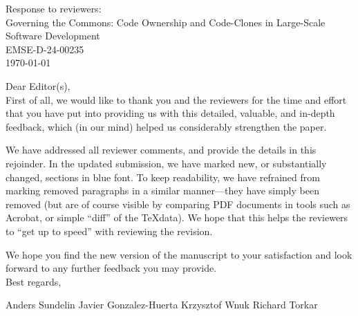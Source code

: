 \documentclass[a4paper,11pt, parskip=half]{scrartcl}
\newcommand{\paperId}{EMSE-D-24-00235}
\newcommand{\paperTitle}{Governing the Commons: Code Ownership and Code-Clones in Large-Scale Software Development}
\begin{document}
\thispagestyle{plain}

\begin{center}
Response to reviewers: \\[1em]

 {\Large \paperTitle} \vspace{0.5cm} \\
 {\paperId{}} \vspace{0.5cm} \\
 \today \vspace{0.5cm} \\
\end{center}


Dear Editor(s), \\

First of all, we would like to thank you and the reviewers for the time and effort that you have put into providing us with this detailed, valuable, and in-depth feedback, which (in our mind) helped us considerably strengthen the paper.

We have addressed all reviewer comments, and provide the details in this rejoinder.
In the updated submission, we have marked new, or substantially changed, sections in {{\color{blue}blue font}}.
To keep readability, we have refrained from marking removed paragraphs in a similar manner---they have simply been removed (but are of course visible by comparing PDF documents in tools such as Acrobat, or simple ``diff'' of the \TeX data).
We hope that this helps the reviewers to ``get up to speed'' with reviewing the revision.

We hope you find the new version of the manuscript to your satisfaction and look forward to any further feedback you may provide.
\\[3em]
Best regards,

Anders Sundelin
Javier Gonzalez-Huerta
Krzysztof Wnuk
Richard Torkar

\newpage


% 
% 
\end{document}
